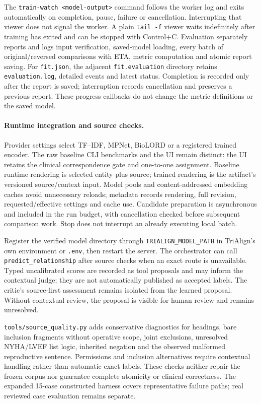 \documentclass[10pt,letterpaper]{article}
\newcommand{\pathcode}[1]{\nolinkurl{#1}}
\begin{document}
The \pathcode{train-watch <model-output>} command follows the worker log and
exits automatically on completion, pause, failure or cancellation. Interrupting
that viewer does not signal the worker. A plain \pathcode{tail -f} viewer waits
indefinitely after training has exited and can be stopped with Control+C.
Evaluation separately reports and logs input verification, saved-model loading,
every batch of original/reversed comparisons with ETA, metric computation and
atomic report saving. For \pathcode{fit.json}, the adjacent
\pathcode{fit.evaluation} directory retains \pathcode{evaluation.log}, detailed
events and latest status. Completion is recorded only after the report is saved;
interruption records cancellation and preserves a previous report. These
progress callbacks do not change the metric definitions or the saved model.

\paragraph{Runtime integration and source checks.}
Provider settings select TF--IDF, MPNet, BioLORD or a registered trained encoder.
The raw baseline CLI benchmarks and the UI remain distinct: the UI retains the
clinical correspondence gate and one-to-one assignment. Baseline runtime
rendering is selected entity plus source; trained rendering is the artifact's
versioned source/context input. Model pools and content-addressed embedding
caches avoid unnecessary reloads; metadata records rendering, full revision,
requested/effective settings and cache use. Candidate preparation is asynchronous
and included in the run budget, with cancellation checked before subsequent
comparison work. Stop does not interrupt an already executing local batch.

Register the verified model directory through \pathcode{TRIALIGN_MODEL_PATH}
in TriAlign's own environment or \pathcode{.env}, then restart the server.
The orchestrator can call \pathcode{predict_relationship} after source checks
when an exact route is unavailable. Typed uncalibrated scores are recorded as
tool proposals and may inform the contextual judge; they are not automatically
published as accepted labels. The critic's source-first assessment remains
isolated from the learned proposal. Without contextual review, the proposal
is visible for human review and remains unresolved.

\pathcode{tools/source_quality.py} adds conservative diagnostics for headings,
bare inclusion fragments without operative scope, joint exclusions, unresolved
NYHA/LVEF list logic, inherited negation and the observed malformed reproductive
sentence. Permissions and inclusion alternatives require contextual handling
rather than automatic exact labels. These checks neither repair the frozen
corpus nor guarantee complete atomicity or clinical correctness. The expanded
15-case constructed harness covers representative failure paths; real reviewed
case evaluation remains separate.
\end{document}
